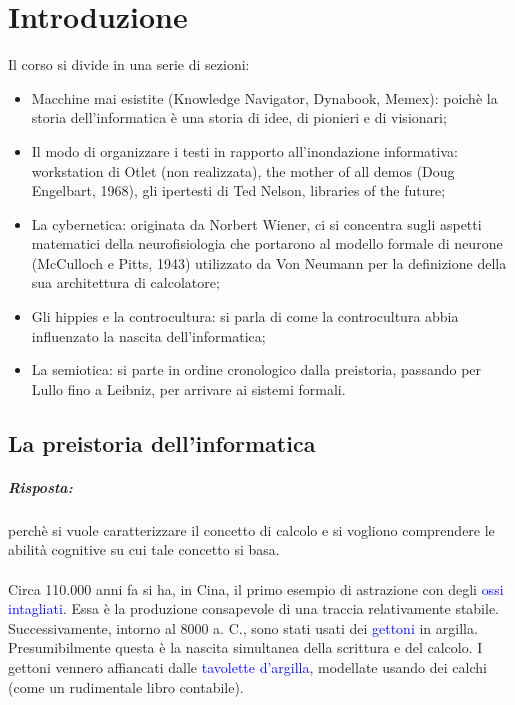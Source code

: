 \chapter{Introduzione}

Il corso si divide in una serie di sezioni:
\begin{itemize}
    \item Macchine mai esistite (Knowledge
    Navigator, Dynabook, Memex): poichè la storia dell'informatica
    è una storia di idee, di pionieri e di visionari;
    \item Il modo di organizzare i testi in rapporto all'inondazione 
    informativa: workstation di Otlet (non realizzata), the mother of all
    demos (Doug Engelbart, 1968), gli ipertesti di Ted Nelson, libraries
    of the future;
    \item La cybernetica: originata da Norbert Wiener, ci si concentra sugli
    aspetti matematici della neurofisiologia che portarono al modello formale di
    neurone (McCulloch e Pitts, 1943) utilizzato da Von Neumann per la
    definizione della sua architettura di calcolatore;
    \item Gli hippies e la controcultura: si parla di come la controcultura 
    abbia influenzato la nascita dell'informatica;
    \item La semiotica: si parte in ordine cronologico dalla preistoria, passando per Lullo fino
    a Leibniz, per arrivare ai sistemi formali.
\end{itemize}

\section{La preistoria dell'informatica}


\paragraph{Risposta:} perchè si vuole caratterizzare il
concetto di calcolo e si vogliono comprendere le abilità cognitive
su cui tale concetto si basa.

\subsubsection{}

Circa 110.000 anni fa si ha, in Cina, il primo esempio di astrazione con degli \textcolor{blue}{ossi intagliati}. Essa è la produzione consapevole di una traccia relativamente stabile. Successivamente, intorno al 8000 a. C., sono stati usati dei \textcolor{blue}{gettoni} in argilla. Presumibilmente questa è la nascita simultanea della scrittura e del calcolo. I gettoni vennero affiancati dalle \textcolor{blue}{tavolette d'argilla}, modellate usando dei calchi (come un rudimentale libro contabile).

